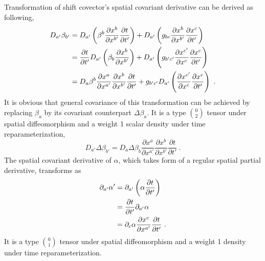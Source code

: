 Transformation of shift covector's spatial covariant derivative can be derived as following, 
\begin{align}\label{shiftvectorcovariantspatialderivativetransform}
D_{a'}\beta_{b'} &= D_{a'}\left(\beta^{b}\frac{\partial x^{b}}{\partial x^{b'}}\frac{\partial t}{\partial t'}\right) + D_{a'}\left(g_{bc}\frac{\partial x^{b}}{\partial x^{b'}}\frac{\partial x^{c}}{\partial t'}\right)\notag\\
& = \frac{\partial t}{\partial t'}D_{a'}\left(\beta_{b}\frac{\partial x^{b}}{\partial x^{b'}}\right) + D_{a'}\left(g_{b'c'}\frac{\partial x^{c'}}{\partial x^{c}}\frac{\partial x^{c}}{\partial t'}\right)\notag\\
& = D_{a}\beta^{b}\frac{\partial x^{a}}{\partial x^{a'}}\frac{\partial x^{b}}{\partial x^{b'}}\frac{\partial t}{\partial t'} + g_{b'c'}D_{a'}\left(\frac{\partial x^{c'}}{\partial x^{c}}\frac{\partial x^{c}}{\partial t'}\right) \ .
\end{align} 
It is obvious that general covariance of this transformation can be achieved by replacing $\beta_{a}$ by its covariant counterpart $\Delta \beta_{a}$. It is a type $0 \choose 2$ tensor under spatial diffeomorphism and a weight 1 scalar density under time reparameterization, 
\begin{equation}\label{covariantshiftvectorcovariantspatialderivativetransform}
	D_{a'}\Delta\beta_{b'} = D_{a}\Delta\beta_{b}\frac{\partial x^{a}}{\partial x^{a'}}\frac{\partial x^{b}}{\partial x^{b'}}\frac{\partial t}{\partial t'} \ .
\end{equation}	
The spatial covariant derivative of $\alpha$, which takes form of a regular spatial partial derivative, transforms as 
\begin{align}\label{lapsefunctionspatialderivative}
\partial_{a'}\alpha' & = \partial_{a'}\left(\alpha \frac{\partial t}{\partial t'}\right) \notag \\
& = \frac{\partial t}{\partial t'}\partial_{a'}\alpha \notag \\
& = \partial_{c}\alpha\frac{\partial x^{c}}{\partial x^{a'}}\frac{\partial t}{\partial t'} \ .
\end{align}
It is a type $0 \choose 1$ tensor under spatial diffeomorphism and a weight 1 density under time reparameterization.

